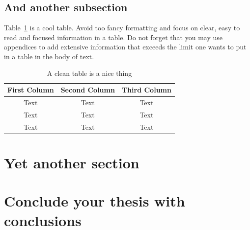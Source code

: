 \documentclass[12pt,twoside]{article}
\begin{document}
\subsection{And another subsection}
Table~\ref{tab:table1} is a cool table. Avoid too fancy formatting and focus on clear, easy to read and focused information in a table. Do not forget that you may use appendices to add extensive information that exceeds the limit one wants to put in a table in the body of text. 

\begin{table}[htp!]
\centering
\caption{A clean table is a nice thing}
\label{tab:table1}
\begin{tabular}{@{}ccc@{}}
\toprule
First Column & Second Column & Third Column \\ \midrule
Text & Text & Text \\
Text & Text & Text \\
Text & Text & Text \\ \bottomrule
\end{tabular}
\end{table}

\section{Yet another section}


\section{Conclude your thesis with conclusions}


\newpage





%

% 
% 
% 
% 
%
% 
% 
% 
%
% 
\end{document}
